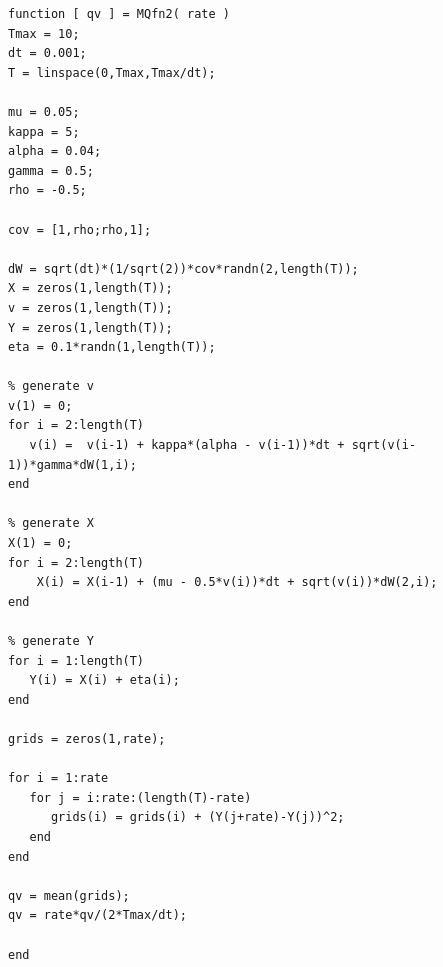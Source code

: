\documentclass[11pt]{article} %
\begin{document}
\begin{verbatim}
function [ qv ] = MQfn2( rate )
Tmax = 10;
dt = 0.001;
T = linspace(0,Tmax,Tmax/dt);

mu = 0.05;
kappa = 5;
alpha = 0.04;
gamma = 0.5;
rho = -0.5;

cov = [1,rho;rho,1];

dW = sqrt(dt)*(1/sqrt(2))*cov*randn(2,length(T));
X = zeros(1,length(T));
v = zeros(1,length(T));
Y = zeros(1,length(T));
eta = 0.1*randn(1,length(T));

% generate v
v(1) = 0;
for i = 2:length(T)
   v(i) =  v(i-1) + kappa*(alpha - v(i-1))*dt + sqrt(v(i-1))*gamma*dW(1,i);
end

% generate X
X(1) = 0;
for i = 2:length(T)
    X(i) = X(i-1) + (mu - 0.5*v(i))*dt + sqrt(v(i))*dW(2,i);
end

% generate Y
for i = 1:length(T)
   Y(i) = X(i) + eta(i);
end

grids = zeros(1,rate);

for i = 1:rate
   for j = i:rate:(length(T)-rate)
      grids(i) = grids(i) + (Y(j+rate)-Y(j))^2;
   end
end

qv = mean(grids);
qv = rate*qv/(2*Tmax/dt);

end

\end{verbatim}
\end{document}
